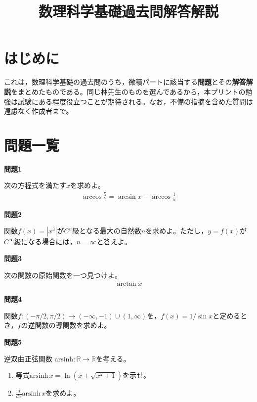 \documentclass[a4paper,12pt,dvipdfmx,fleqn, oneside]{jsarticle}
\title{数理科学基礎過去問解答解説}
\author{}
\date{}
\theoremstyle{defstyle}
\theoremstyle{thmx}
\theoremstyle{qesstyle}
\begin{document}
\setlength{\abovedisplayskip}{4pt}
\setlength{\belowdisplayskip}{4pt}
\maketitle

\section*{はじめに}
これは，数理科学基礎の過去問のうち，微積パートに該当する\textbf{問題}とその\textbf{解答解説}をまとめたものである。同じ林先生のものを選んであるから，本プリントの勉強は試験にある程度役立つことが期待される。なお，不備の指摘を含めた質問は遠慮なく作成者まで。
\section*{問題一覧}
\begin{shadebox}
    \textbf{問題1}

    \text{　}次の方程式を満たす$x$を求めよ。
    \begin{align*}
        \arccos \frac{5}{7} = \arcsin x- \arccos \frac{1}{5}
    \end{align*}
\end{shadebox}
\begin{shadebox}
    \textbf{問題2}

    \text{　}関数$f(x)=\left|x^3\right|$が$C^n$級となる最大の自然数$n$を求めよ。ただし，$y=f(x)$が$C^{\infty}$級になる場合には，$n=\infty$と答えよ。
\end{shadebox}
\begin{shadebox}
    \textbf{問題3}

    \text{　}次の関数の原始関数を一つ見つけよ。
    \begin{align*}
        \arctan x
    \end{align*}
\end{shadebox}
\begin{shadebox}
    \textbf{問題4}

    \text{　}関数$f:(-\pi/ 2, \pi / 2) \rightarrow (- \infty , -1) \cup (1, \infty)$を，$f(x)=1/\sin x$と定めるとき，$f$の逆関数の導関数を求めよ。
\end{shadebox}
\begin{shadebox}
    \textbf{問題5}

    \text{　}逆双曲正弦関数 $\text{arsinh} : \mathbb{R} \rightarrow \mathbb{R}$を考える。
    \begin{enumerate}
        \item 等式$\text{arsinh}\, x = \ln(x+\sqrt{x^2+1})$を示せ。
        \item $\frac{d}{dx} \text{arsinh} \, x$を求めよ。
    \end{enumerate}
\end{shadebox}
\end{document}
